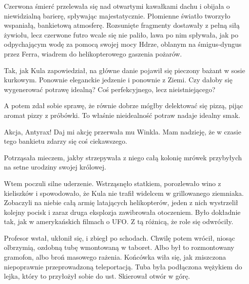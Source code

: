 Czerwona śmierć przelewała się nad otwartymi kawałkami dachu i obijała o niewidzialną barierę, spływając majestatycznie.
Płomienne światło tworzyło wspaniałą, bankietową atmosferę.
Rozsunięte fragmenty dostawały z pełną siłą żywiołu, lecz czerwone futro wcale się nie paliło, lawa po nim spływała, 
jak po odpychającym wodę za pomocą swojej mocy Hdrze, oblanym na śmigus-dyngus przez Ferra, wiadrem do helikopterowego gaszenia pożarów.

Tak, jak Kula zapowiedział, na główne danie pojawił się pieczony bażant w sosie kurkowym.
Ponownie eleganckie jedzenie i ponownie z Ziemi. 
Czy dałoby się wygenerować potrawę idealną? 
Coś perfekcyjnego, lecz nieistniejącego?

A potem zdał sobie sprawę, że równie dobrze mógłby delektować się pizzą, pijąc aromat pizzy z próbówki.
To właśnie nieidealność potraw nadaje idealny smak.

\divider{} 

\begin{dialogue}
\ds{} Akcja, Antyrax! Daj mi akcję \dm{} przerwała mu Winkla. \dm{} Mam nadzieję, że w czasie tego bankietu zdarzy się coś ciekawszego.
\end{dialogue}
Potrząsała mieczem, jakby strzepywała z niego całą kolonię mrówek przybyłych na setne urodziny swojej królowej.

\divider{}

Wtem poczuli silne uderzenie. Wstrząsnęło statkiem, porozlewało wino z kieliszków i spowodowało, że Kula nie trafił widelcem w grillowanego ziemniaka.
Zobaczyli na niebie całą armię latających helikopterów, jeden z nich wystrzelił kolejny pocisk i zaraz druga eksplozja zawibrowała otoczeniem.
Było dokładnie tak, jak w amerykańskich filmach o UFO. Z tą różnicą, że role się odwróciły.

Profesor wstał, ukłonił się, i zbiegł po schodach. Chwilę potem wrócił, niosąc olbrzymią, ozdobną tubę wmontowaną w taboret. 
Albo był to rozmontowany gramofon, albo broń masowego rażenia. Końcówka wiła się, jak zniszczona niepoprawnie przeprowadzoną teleportacją.
Tuba była podłączona wężykiem do lejka, który to przyłożył sobie do ust.
Skierował otwór w górę.

